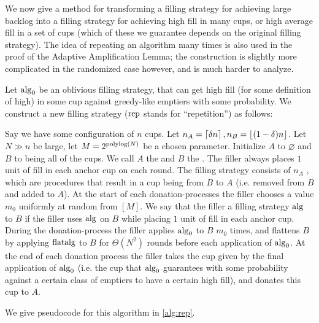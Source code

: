 We now give a method for transforming a filling strategy for achieving
large backlog into a filling strategy for achieving high fill in
many cups, or high average fill in a set of cups (which of these
we guarantee depends on the original filling strategy). The idea
of repeating an algorithm many times is also used in the proof of
the Adaptive Amplification Lemma; the construction is slightly more
complicated in the randomized case however, and is much harder to
analyze.

\begin{definition}
  \label{def:rep}
  {\normalfont
  Let $\operatorname{\text{\textup{alg}}}_0$ be an oblivious filling strategy, that can get
  high fill (for some definition of high) in some cup against
  greedy-like emptiers with some probability. We construct a new
  filling strategy  ($\operatorname{\text{\textup{rep}}}$ stands
  for \enquote{repetition}) as follows:

  Say we have some configuration of $n$ cups.
  Let $n_A = \left\lceil \delta n \right\rceil, n_B = \left\lfloor (1-\delta)n \right\rfloor$. Let $N
  \gg n$ be large, let $M=2^{\operatorname{\text{polylog}}(N)}$ be a chosen parameter. 
  Initialize $A$ to $\varnothing$ and $B$ to
  being all of the cups. We call $A$ the  and
  $B$ the . The filler always places $1$
  unit of fill in each anchor cup on each round. The filling
  strategy consists of $n_A$ , which are
  procedures that result in a cup being  from $B$
  to $A$ (i.e. removed from $B$ and added to $A$). At the start
  of each donation-processes the filler chooses a value $m_0$
  uniformly at random from $[M]$. We say that the filler
   a filling strategy $\operatorname{\text{\textup{alg}}}$ to $B$ if the
  filler uses $\operatorname{\text{\textup{alg}}}$ on $B$ while placing $1$ unit of fill
  in each anchor cup. During the donation-process the filler
  applies $\operatorname{\text{\textup{alg}}}_0$ to $B$ $m_0$ times, and flattens $B$ by
  applying $\operatorname{\text{\textup{flatalg}}}$ to $B$ for $\Theta(N^2)$ rounds before each
  application of $\operatorname{\text{\textup{alg}}}_0$. At the end of each donation process
  the filler takes the cup given by the final application of
  $\operatorname{\text{\textup{alg}}}_0$ (i.e. the cup that $\operatorname{\text{\textup{alg}}}_0$ guarantees with some
  probability against a certain class of emptiers to have a
  certain high fill), and donates this cup to $A$. 

  We give pseudocode for this algorithm in \cref{alg:rep}.
 }


\end{definition}
